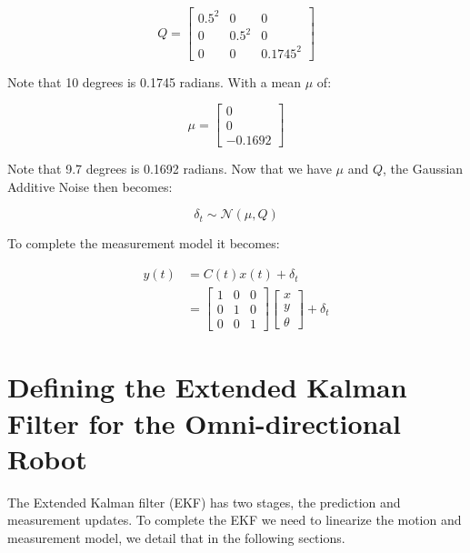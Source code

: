 \documentclass{article}
\begin{document}
\begin{equation}
	Q = 
	\begin{bmatrix}
		0.5^{2} & 0 & 0 \\
		0 & 0.5^{2} & 0 \\
		0 & 0 & 0.1745^{2}		
	\end{bmatrix}
\end{equation}

Note that 10 degrees is 0.1745 radians. With a mean $\mu$ of:

\begin{equation}
	\mu = 
	\begin{bmatrix}
		0 \\
		0 \\
		-0.1692 
	\end{bmatrix}
\end{equation}

Note that 9.7 degrees is 0.1692 radians. Now that we have $\mu$ and $Q$, the 
Gaussian Additive Noise then becomes:

\begin{equation}
	\delta_{t} \sim \mathcal{N} (\mu, Q)
\end{equation}

To complete the measurement model it becomes:

\begin{align}
	y(t) &= C(t) x(t) + \delta_{t} \\
	&=
	\begin{bmatrix}
		1 & 0 & 0 \\
		0 & 1 & 0 \\
		0 & 0 & 1
	\end{bmatrix}
	\begin{bmatrix}
		x \\
		y \\
		\theta 
	\end{bmatrix}
	+
	\delta_{t}
\end{align}




\newpage
\section{Defining the Extended Kalman Filter for the Omni-directional Robot}
\label{sec:ekf_defintion}

The Extended Kalman filter (EKF) has two stages, the prediction and measurement 
updates. To complete the EKF we need to linearize the motion and measurement 
model, we detail that in the following sections.
\end{document}
